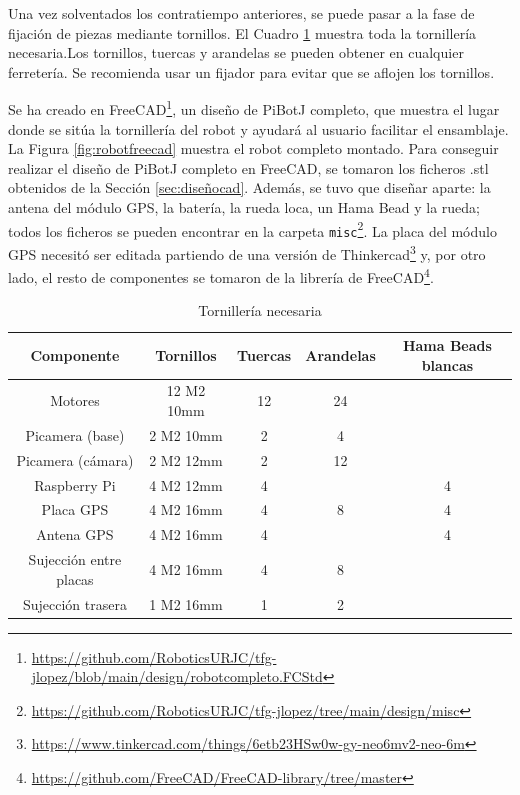 Una vez solventados los contratiempo anteriores, se puede pasar a la fase de fijación de piezas mediante tornillos. El Cuadro \ref{cuadro:tornillos} muestra toda la tornillería necesaria.Los tornillos, tuercas y arandelas se pueden obtener en cualquier ferretería. Se recomienda usar un fijador para evitar que se aflojen los tornillos.

Se ha creado en FreeCAD\footnote{\url{https://github.com/RoboticsURJC/tfg-jlopez/blob/main/design/robotcompleto.FCStd}}, un diseño de PiBotJ completo, que muestra el lugar donde se sitúa la tornillería del robot y ayudará al usuario facilitar el ensamblaje. La Figura \ref{fig:robotfreecad} muestra el robot completo montado. Para conseguir realizar el diseño de PiBotJ completo en FreeCAD, se tomaron los ficheros .stl obtenidos de la Sección \ref{sec:diseñocad}. Además, se tuvo que diseñar aparte: la antena del módulo \acs{GPS}, la batería, la rueda loca, un Hama Bead y la rueda; todos los ficheros se pueden encontrar en la carpeta \verb|misc|\footnote{\url{https://github.com/RoboticsURJC/tfg-jlopez/tree/main/design/misc}}. La placa del módulo \acs{GPS} necesitó ser editada partiendo de una versión de Thinkercad\footnote{\url{https://www.tinkercad.com/things/6etb23HSw0w-gy-neo6mv2-neo-6m}} y, por otro lado, el resto de componentes se tomaron de la librería de FreeCAD\footnote{\url{https://github.com/FreeCAD/FreeCAD-library/tree/master}}.

\begin{table}[H]
	\begin{center}
		\begin{tabular}{|c|c|c|c|c|}
			\hline
			Componente & Tornillos & Tuercas & Arandelas & Hama Beads blancas\\
			\hline
			Motores & 12 M2 10mm & 12 & 24 &\\
			\hline
			Picamera (base) & 2 M2 10mm & 2 & 4 &\\
			\hline
			Picamera (cámara) & 2 M2 12mm & 2 & 12 &\\
			\hline
			Raspberry Pi & 4 M2 12mm & 4 & & 4\\
			\hline
			Placa GPS & 4 M2 16mm & 4 & 8 & 4\\
			\hline
			Antena GPS & 4 M2 16mm & 4 & & 4\\
			\hline
			Sujección entre placas & 4 M2 16mm & 4 & 8 &\\
			\hline
			Sujección trasera & 1 M2 16mm & 1 & 2 &\\
			\hline
		\end{tabular}
		\caption{Tornillería necesaria}
		\label{cuadro:tornillos}
	\end{center}
\end{table}

